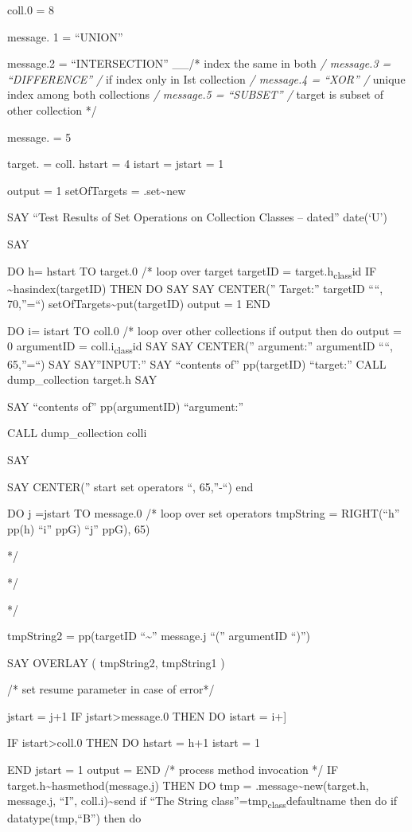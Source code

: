 coll.0 = 8

message. 1 = ``UNION''

message.2 = ``INTERSECTION'' \_\_/* index the same in both \emph{/
message.3 = ``DIFFERENCE'' /} if index only in Ist collection \emph{/
message.4 = ``XOR'' /} unique index among both collections \emph{/
message.5 = ``SUBSET'' /} target is subset of other collection */

message. = 5

target. = coll. hstart = 4 istart = \textbar{} jstart = 1

output = 1 setOfTargets = .set\textasciitilde new

SAY ``Test Results of Set Operations on Collection Classes -- dated''
date(`U')

SAY

DO h= hstart TO target.0 /* loop over target targetID =
target.h\textsubscript{class}id IF
\setOfTargets\textasciitilde hasindex(targetID) THEN DO SAY SAY
CENTER('' Target:'' targetID ````, 70,''=``)
setOfTargets\textasciitilde put(targetID) output = 1 END

DO i= istart TO coll.0 /* loop over other collections if output then do
output = 0 argumentID = coll.i\textsubscript{class}id SAY SAY CENTER(''
argument:'' argumentID ````, 65,''=``) SAY SAY''INPUT:'' SAY ``contents
of'' pp(targetID) ``target:'' CALL dump\_collection target.h SAY

SAY ``contents of'' pp(argumentID) ``argument:''

CALL dump\_collection colli

SAY

SAY CENTER('' start set operators ``, 65,''-``) end

DO j =jstart TO message.0 /* loop over set operators tmpString
\textbar{} = RIGHT(``h'' pp(h) ``i'' ppG) ``j'' ppG), 65)

*/

*/

*/

tmpString2 = pp(targetID ``\textasciitilde{}'' message.j
\textbar\textbar{} ``('' argumentID ``)'')

SAY OVERLAY ( tmpString2, tmpString1 )

/* set resume parameter in case of error*/

jstart = j+1 IF jstart\textgreater message.0 THEN DO istart = i+{]}

IF istart\textgreater coll.0 THEN DO hstart = h+1 istart = 1

END jstart = 1 output = \textbar{} END /* process method invocation */
IF target.h\textasciitilde hasmethod(message.j) THEN DO tmp =
.message\textasciitilde new(target.h, message.j, ``I'',
coll.i)\textasciitilde send if ``The String
class''=tmp\textsubscript{class}defaultname then do if
datatype(tmp,``B'') then do


